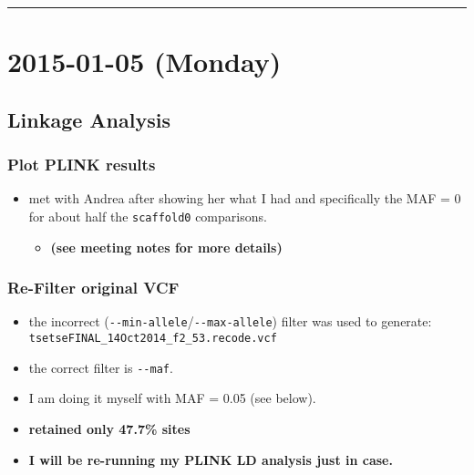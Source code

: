 \documentclass[letterpaper]{scrartcl}
\begin{document}
\begin{center}\rule{0.5\linewidth}{\linethickness}\end{center}

\section{2015-01-05 (Monday)}\label{monday}

\subsection{Linkage Analysis}\label{linkage-analysis-2}

\subsubsection{Plot PLINK results}\label{plot-plink-results-2}

\begin{itemize}
\itemsep1pt\parskip0pt
\item
  met with Andrea after showing her what I had and specifically the MAF
  = 0 for about half the \texttt{scaffold0} comparisons.

  \begin{itemize}
  \itemsep1pt\parskip0pt
  \item
    \textbf{(see meeting notes for more details)}
  \end{itemize}
\end{itemize}

\subsubsection{Re-Filter original VCF}\label{re-filter-original-vcf}

\begin{itemize}
\itemsep1pt\parskip0pt
\item
  the incorrect (\texttt{-\/-min-allele}/\texttt{-\/-max-allele}) filter
  was used to generate:
  \texttt{tsetseFINAL\_14Oct2014\_f2\_53.recode.vcf}
\item
  the correct filter is \texttt{-\/-maf}.
\item
  I am doing it myself with MAF = 0.05 (see below).
\item
  \textbf{retained only 47.7\% sites}
\item
  \textbf{I will be re-running my PLINK LD analysis just in case.}
\end{itemize}
\end{document}
